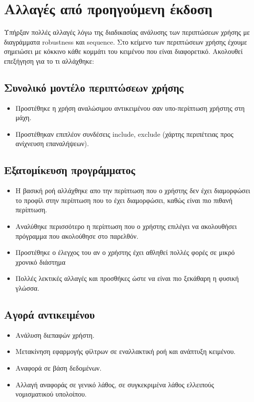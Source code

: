 \section*{Αλλαγές από προηγούμενη έκδοση}
Υπήρξαν πολλές αλλαγές λόγω της διαδικασίας ανάλυσης των περιπτώσεων χρήσης με διαγράμματα robustness και sequence. Στο κείμενο των περιπτώσεων χρήσης έχουμε σημειώσει με κόκκινο κάθε κομμάτι του κειμένου που είναι διαφορετικό. Ακολουθεί επεξήγηση για το τι αλλάχθηκε:
\subsection{Συνολικό μοντέλο περιπτώσεων χρήσης}
\begin{itemize}
\item Προστέθηκε η χρήση αναλώσιμου αντικειμένου σαν υπο-περίπτωση χρήστης στη μάχη.
\item Προστέθηκαν επιπλέον συνδέσεις include, exclude (χάρτης περιπέτειας προς ανίχνευση επαναλήψεων).
\end{itemize}
\subsection{Εξατομίκευση προγράμματος}
\begin{itemize}
    \item Η βασική ροή αλλάχθηκε απο την περίπτωση που ο χρήστης δεν έχει διαμορφώσει το προφίλ στην περίπτωση που το έχει διαμορφώσει, καθώς είναι πιο πιθανή περίπτωση.
    \item Αναλύθηκε περισσότερο η περίπτωση που ο χρήστης επιλέγει να ακολουθήσει πρόγραμμα που ακολούθησε στο παρελθόν.
    \item Προστέθηκε ο έλεγχος του αν ο χρήστης έχει αθληθεί πολλές φορές σε μικρό χρονικό διάστημα
    \item Πολλές λεκτικές αλλαγές και προσθήκες ώστε να είναι πιο ξεκάθαρη η φυσική γλώσσα.
\end{itemize}
\subsection{Αγορά αντικειμένου}
\begin{itemize}
    \item Ανάλυση διεπαφών χρήστη.
    \item Μετακίνηση εφαρμογής φίλτρων σε εναλλακτική ροή και ανάπτυξη κειμένου.
    \item Αναφορά σε βάση δεδομένων.
    \item Αλλαγή αναφοράς σε γενικό λάθος, σε συγκεκριμένα λάθος ελλειπούς νομισματικού υπολοίπου.
\end{itemize}
